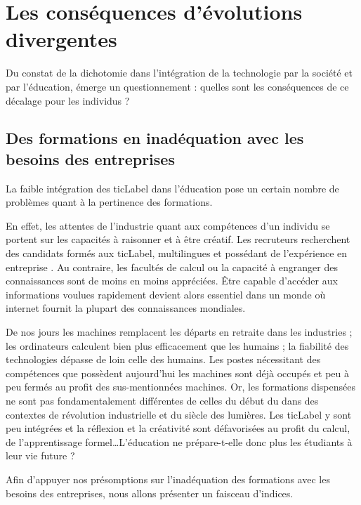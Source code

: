 
\chapter{Les conséquences d'évolutions divergentes}
Du constat de la dichotomie dans l'intégration de la technologie par la société et par l'éducation, émerge un questionnement : quelles sont les conséquences de ce décalage pour les individus ?



\section{Des formations en inadéquation avec les besoins des entreprises}
La faible intégration des \gls{ticLabel} dans l'éducation pose un certain nombre de problèmes quant à la pertinence des formations.

En effet, les attentes de l'industrie quant aux compétences d'un individu se portent sur les capacités à raisonner et à être créatif. Les recruteurs recherchent des candidats formés aux \gls{ticLabel}, multilingues et possédant de l'expérience en entreprise \cite{DRH_criteres}. Au contraire, les facultés de calcul ou la capacité à engranger des connaissances sont de moins en moins appréciées. Être capable d'accéder aux informations voulues rapidement devient alors essentiel dans un monde où internet fournit la plupart des connaissances mondiales.

De nos jours les machines remplacent les départs en retraite dans les industries ; les ordinateurs calculent bien plus efficacement que les humains ; la fiabilité des technologies dépasse de loin celle des humains. Les postes nécessitant des compétences que possèdent aujourd'hui les machines sont déjà occupés et peu à peu fermés au profit des sus-mentionnées machines. Or, les formations dispensées ne sont pas fondamentalement différentes de celles du début du   \cite{robinson2010paradigms} dans des contextes de révolution industrielle et du siècle des lumières. Les \gls{ticLabel} y sont peu intégrées et la réflexion et la créativité sont défavorisées au profit du calcul, de l'apprentissage formel\ldots L'éducation ne prépare-t-elle donc plus les étudiants à leur vie future \cite{formation_recrutement} ?

Afin d'appuyer nos présomptions sur l'inadéquation des formations avec les besoins des entreprises, nous allons présenter un faisceau d'indices.

